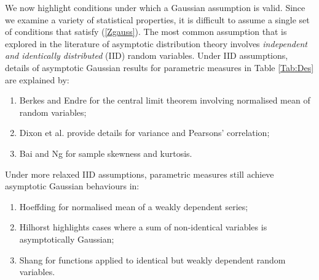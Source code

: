   
We now highlight conditions under which a Gaussian assumption is valid. 
Since we examine a variety of statistical properties, it is difficult to assume a single set of conditions that satisfy  (\ref{Zgauss}).   
The  most common assumption  that is explored in the literature of  asymptotic distribution theory involves   {\it independent and identically distributed } (IID) random variables. 
Under IID assumptions, details of  asymptotic Gaussian results for  parametric measures in Table \ref{Tab:Des} are explained by: %
\begin{enumerate}
\item Berkes and Endre   \cite{CLT} for the  central limit theorem involving  normalised mean of random variables;
\item Dixon  et al. \cite{dixon1969} provide details for  variance and Pearsons' correlation;
\item Bai and Ng \cite{Kdist} %
for sample skewness and kurtosis.
\end{enumerate}
 Under more relaxed IID assumptions,   parametric measures still achieve  asymptotic Gaussian behaviours in: %
\begin{enumerate}
\item Hoeffding  \cite{hoeffding1948} for  normalised mean of a weakly dependent series;  
\item Hilhorst \cite{hilhorst2009} highlights cases where a sum of non-identical variables is asymptotically Gaussian;
\item  Shang \cite{dCLT}  for functions applied to identical but weakly dependent random  variables. %
\end{enumerate}
 
 
 
